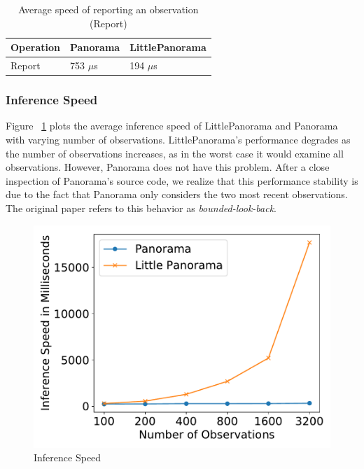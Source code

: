 \begin{table}[!tb]
\begin{tabular}{p{}p{}p{}}%

\textbf{Operation} & \textbf{Panorama} & \textbf{LittlePanorama} \\
\midrule
  Report   &    753 $\mu$s  &  194 $\mu$s  \\
\end{tabular}
\vspace{0.5em}
\caption{Average speed of reporting an observation (Report)}
\label{tab:microbench}
\end{table}

\subsubsection{Inference Speed\label{subsubsec:inference}} Figure ~\ref{fig:inference} plots the average inference speed of LittlePanorama and Panorama with varying number of observations. LittlePanorama's performance degrades as the number of observations increases, as in the worst case it would examine all observations. However, Panorama does not have this problem. After a close inspection of Panorama's source code, we realize that this performance stability is due to the fact that Panorama only considers the two most recent observations. The original paper refers to this behavior as \textit{bounded-look-back}.

\begin{figure}[!tb]
\centering
\includegraphics[scale=0.4]{figs/inference.pdf}
\vspace{-1em}
\caption{Inference Speed
\label{fig:inference}
}
\end{figure}

